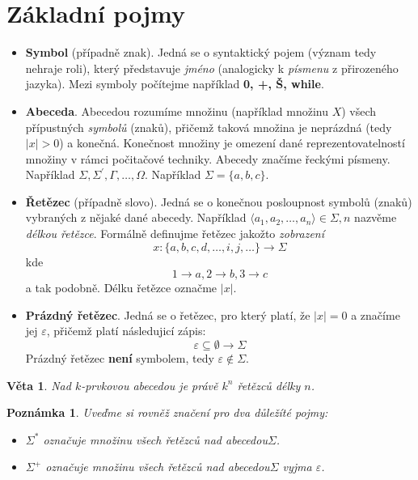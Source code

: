 \documentclass[10pt, a4paper, titlepage]{article}
\theoremstyle{note}
\newtheorem{veta}{\textbf{Věta}}
\newtheorem{poznamka}{\textbf{Poznámka}}
\begin{document}
\section{Základní pojmy}
\begin{itemize}
\item
\textbf{Symbol} (případně znak). Jedná se o syntaktický pojem (význam tedy nehraje roli), který představuje \emph{jméno} (analogicky k \emph{písmenu} z přirozeného jazyka).
Mezi symboly počítejme například \textbf{0, +, Š, while}.

\item
\textbf{Abeceda}. Abecedou rozumíme množinu (například množinu $X$) všech přípustných \emph{symbolů} (znaků), přičemž taková množina je neprázdná (tedy $|x|>0$) a konečná.
Konečnost množiny je omezení dané reprezentovatelností množiny v rámci počitačové techniky.
Abecedy značíme řeckými písmeny. Například $\Sigma, \Sigma^{'}, \Gamma, \ldots, \Omega$.
Například $\Sigma = \lbrace a, b, c \rbrace$.

\item
\textbf{Řetězec} (případně slovo). Jedná se o konečnou posloupnost symbolů (znaků) vybraných z nějaké dané abecedy.
Například $\langle a_{1}, a_{2}, \ldots, a_{n} \rangle \in \Sigma, n$ nazvěme \emph{délkou řetězce}.
Formálně definujme řetězec jakožto \emph{zobrazení}
$$
x : \lbrace a, b, c, d, \ldots, i, j, \ldots \rbrace \rightarrow \Sigma
$$
kde
$$
1 \rightarrow a, 2 \rightarrow b, 3 \rightarrow c
$$ a tak podobně.
Délku řetězce označme $|x|$.

\item
\textbf{Prázdný řetězec}. Jedná se o řetězec, pro který platí, že $|x| = 0$ a značíme jej $\varepsilon$, přičemž platí následujicí zápis:
$$
\varepsilon \subseteq \emptyset \rightarrow \Sigma
$$
Prázdný řetězec \textbf{není} symbolem, tedy $\varepsilon \notin \Sigma$.
\end{itemize}

\begin{veta}
Nad $k$-prvkovou abecedou je právě $k^{n}$ řetězců délky $n$.
\end{veta}


\begin{poznamka}
Uveďme si rovněž značení pro dva důležíté pojmy:

\begin{itemize}
\item
$\Sigma^{*}$ označuje množinu všech řetězců nad abecedou$\Sigma$.

\item
$\Sigma^{+}$ označuje množinu všech řetězců nad abecedou$\Sigma$ vyjma $\varepsilon$.
\end{itemize}
\end{poznamka}
\end{document}
